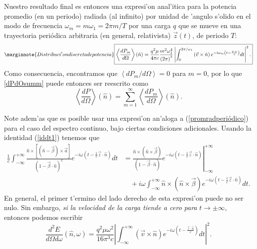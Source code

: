 Nuestro resultado final es entonces una expresi'on anal'itica para la potencia promedio (en un periodo) radiada (al infinito) por unidad de 'angulo s'olido en el modo de frecuencia
$\omega_m=m\omega_1=2\pi {m}/{T}$ por una carga $q$ que se mueve en una
trayectoria periódica arbitraria (en general, relativista) $\vec{z}(t)$, de
periodo $T$:
\begin{equation}\marginnote{Distribuci'on discreta de potencia}
\boxed{\left\langle \frac{dP_{m}}{d\Omega}\right\rangle (\hat{n})
=\frac{q^2\mu}{4\pi c}\frac{m^2\omega_1^4}{\left(2\pi\right)^3}\left|
\int_0^{2\pi/\omega_1}\left(  \vec{v}\times\hat{n}\right)
e^{-i\omega_{m}\left(t-\frac{\vec{z}\cdot\hat{n}}{c}\right)}dt\right|^2.}
\label{promradperiódico}
\end{equation}
Como consecuencia, encontramos que $\left\langle {dP_{m}}/{d\Omega}\right\rangle=0$ para $m=0$, por lo que \eqref{dPdOsumm} puede entonces ser reescrito como
\begin{equation}
\boxed{\left\langle \frac{dP}{d\Omega}\right\rangle (\hat{n}) = \sum_{m=1}^\infty\left\langle \frac{dP_{m}}{d\Omega}\right\rangle (\hat{n}).}
\end{equation}

Note adem'as que es posible usar una expresi'on an'aloga a (\ref{promradperiódico}) para el caso del espectro continuo, bajo ciertas condiciones adicionales. Usando la identidad (\ref{iddt1}) tenemos que
\begin{align}
\frac{1}{c}\int_{-\infty}^{+\infty}\frac{\hat{n}\times\left[\left(\hat{n}-\vec{\beta}\right) \times\vec{a}\right]}{\left(
1-\vec{\beta}\cdot\hat{n}\right)^2}e^{-i\omega\left(  t
-\frac{1}{c}\vec{z}\cdot\hat{n}\right)}dt
&= \left.\frac{\hat{n}\times\left(  \hat{n}\times\vec{\beta}\right)
}{\left(1-\vec{\beta}\cdot\hat{n}\right)}
e^{-i\omega\left(t-\frac{1}{c}\vec{z}\cdot\hat{n}\right)}\right|^{+\infty}_{-\infty}
\nonumber\\
&\quad +i\omega \int_{-\infty}^{+\infty}\hat{n}\times\left(\hat{n}\times\vec{\beta}\right)
e^{-i\omega\left(t-\frac{1}{c}\vec{z}\cdot\hat{n}\right)  }dt.
\end{align}
En general, el primer t'ermino del lado derecho de esta expresi'on puede no ser nulo. Sin embargo, \textit{si la velocidad de la carga tiende a cero para} $t\to\pm\infty$, entonces podemos escribir
\begin{equation}
\boxed{\frac{d^2E}{d\Omega d\omega}(\hat{n},\omega)
=\frac{q^2\mu\omega^2}{16\pi^3c}\left|\int_{-\infty}^{+\infty}
\left(  \vec{v}\times\hat{n}\right)
e^{-i\omega\left(t-\frac{\vec{z}\cdot\hat{n}}{c}\right)  }dt\right|^2 .} \label{dEdOdo2}
\end{equation}

